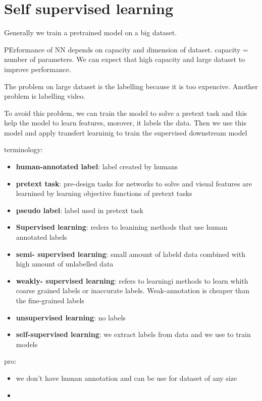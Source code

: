 \chapter{Self supervised learning}
Generally we train a pretrained model on a big dataset.

PErformance of NN depends on capacity and dimension of dataset.
capacity = number of parameters. We can expect that high capacity and large dataset 
to improve performance. 

The problem on large dataset is the labelling because it is too expencive. Another 
problem is labelling video.

To avoid this problem, we can train the model to solve a pretext task and this 
help the model to learn features, morover, it labels the data. Then we use this model 
and apply transfert learninig to train the supervised downstream model

terminology:
\begin{itemize}
    \item \textbf{human-annotated label}: label created by humans
    \item \textbf{pretext task}: pre-design tasks for networks to solve and visual
    features  are learnined by learning objective functions of pretext tasks
    \item \textbf{pseudo label}: label used in pretext task 
    \item \textbf{Supervised learning}: reders to leanining methods that use 
    human annotated labels
    \item \textbf{semi- supervised learning}: small amount of labeld data combined 
    with high amount of unlabelled data
    \item \textbf{weakly- supervised learning}: refers to learningi methods to learn whith 
    coarse grained labels or inaccurate labels. Weak-annotation is cheaper than the fine-grained labels 
    \item \textbf{unsupervised learning}: no labels
    \item \textbf{self-supervised learning}: we extract labels from data and we use to train models
\end{itemize}

pro:
\begin{itemize}
    \item we don't have human annotation and can be use for dataset of any size
    \item 
\end{itemize}

